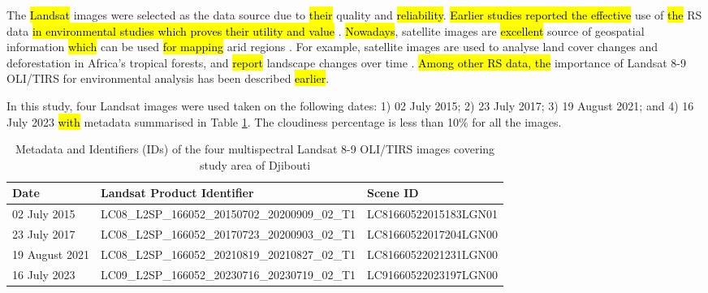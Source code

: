 \documentclass[jimaging,article,submit,pdftex,moreauthors]{Definitions/mdpi}
\begin{document}
The \hl{Landsat} images were selected as the data source due to \hl{their} quality and \hl{reliability}\cite{GONG2024149,ALLU2025127478,CHANUWANWIJESINGHE2024112681}. \hl{Earlier studies reported the effective} use of \hl{the} RS data \hl{in environmental studies which proves their utility and value }\cite{WANG2023311,DAREM2023341,FAROOQ2024101168,AFUYE2024103262,CHUGHTAI2021100482,VELASTEGUIMONTOYA2023100659,FARHAN2024103689}. \hl{Nowadays}, satellite images are \hl{excellent} source of geospatial information \hl{which} can be used \hl{for mapping} arid regions\hl{ }  \cite{AMAZIRH2023104586,FERCHICHI2024122211,MEKONNEN20251}. For example, satellite images are used to analyse land cover changes and deforestation in Africa's tropical forests, and\hl{ report }landscape changes over time \cite{PARRAPAITAN2024103796,ZHAO2024506,NZABARINDA2025114849,MONTEROBOTEY2024e03068}. \hl{Among other RS data, the} importance of Landsat 8-9 OLI/TIRS for environmental analysis has been described \hl{earlier}\cite{AKSOY20221072,NESARI2024101989,KUMAR2022100578}.

In this study, four Landsat images were used taken on the following dates: 1) 02 July 2015; 2) 23 July 2017; 3) 19 August 2021; and 4) 16 July 2023\hl{ with} metadata\hl{ }summarised in Table \ref{tab01}. The cloudiness percentage is less than 10\% for all the images. 

\begin{table}[H]
\caption{Metadata and Identifiers (IDs) of the four multispectral Landsat 8-9 OLI/TIRS images covering study area of Djibouti}
\label{tab01}
\setlength\tabcolsep{0pt}
\begin{tabularx}{\textwidth}{ X l X }
\textbf{Date} & \textbf{Landsat Product Identifier} & \textbf{Scene ID} \\
\midrule
	02 July 2015 & LC08\_L2SP\_166052\_20150702\_20200909\_02\_T1 & LC81660522015183LGN01 \\
	23 July 2017 &  LC08\_L2SP\_166052\_20170723\_20200903\_02\_T1 & LC81660522017204LGN00 \\
	19 August 2021 & LC08\_L2SP\_166052\_20210819\_20210827\_02\_T1 & LC81660522021231LGN00 \\
	16 July 2023 & LC09\_L2SP\_166052\_20230716\_20230719\_02\_T1 & LC91660522023197LGN00 \\
\bottomrule
\end{tabularx}
\end{table} 
\end{document}
